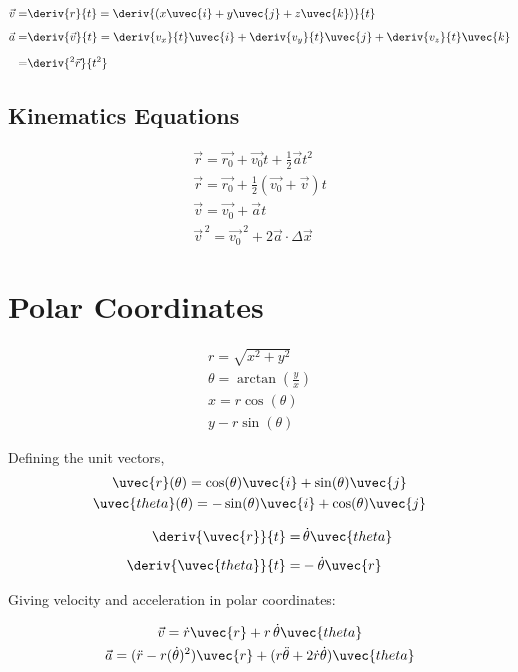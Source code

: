 \documentclass{notes}
\begin{document}
\begin{align}
    \vec{v} =& \deriv{r}{t} = \deriv{(x\uvec{i}+y\uvec{j}+z\uvec{k})}{t}\\[5pt]
    \vec{a} =& \deriv{\vec{v}}{t} = \deriv{v_x}{t}\uvec{i} + \deriv{v_y}{t}\uvec{j} + \deriv{v_z}{t}\uvec{k} \\[6pt]
     =& \deriv{^2\vec{r}}{t^2}
\end{align}

\subsection{Kinematics Equations}

\begin{gather}
    \vec{r} = \vec{r_0} + \vec{v_0}t + \frac{1}{2} \vec{a}t^2\\
    \vec{r} = \vec{r_0} + \frac{1}{2} (\vec{v_0}+ \vec{v})t\\
    \vec{v} = \vec{v_0} + \vec{a}t\\
    \vec{v}^{\,2} = \vec{v_0}^{\,2} + 2\vec{a}\cdot \Delta\vec{x}
\end{gather}

\section{Polar Coordinates}

\begin{gather}
    r = \sqrt{x^2+y^2} \\
    \theta = \arctan(\frac{y}{x})\\
    x = r\cos(\theta)\\
    y - r\sin(\theta)
\end{gather}

Defining the unit vectors,
\begin{gather}
    \uvec{r}(\theta) = \cos(\theta)\uvec{i} + \sin(\theta)\uvec{j}\\
    \uvec{theta}(\theta) = -\sin(\theta)\uvec{i} + \cos(\theta)\uvec{j}
\end{gather}

\begin{align}
    \deriv{\uvec{r}}{t} =& \, \dot{\theta} \uvec{theta}\\[4pt]
    \deriv{\uvec{theta}}{t} =& -\dot{\theta} \uvec{r}
\end{align}

Giving velocity and acceleration in polar coordinates:

\begin{gather}
    \vec{v} = \dot{r}\uvec{r} + r \, \dot{\theta} \uvec{theta}\\
    \vec{a} = (\ddot{r}-r(\dot{\theta})^2)\uvec{r} + (r\ddot{\theta} + 2\dot{r}\dot{\theta})\uvec{theta}
\end{gather}
\end{document}
